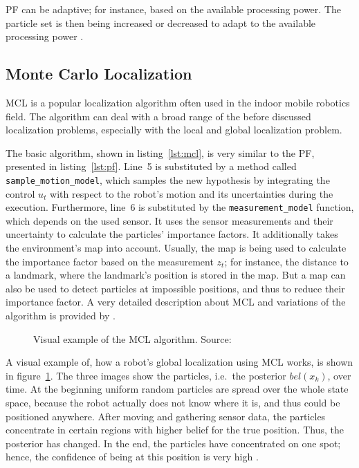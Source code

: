 \ac{PF} can be adaptive; for instance, based on the available processing power. The particle set is then being increased or decreased to adapt to the available processing power \citep{thrun:prob_robo}.


\subsection{Monte Carlo Localization}\label{sec:fund_mcl}
\ac{MCL} is a popular localization algorithm often used in the indoor mobile robotics field. The algorithm can deal with a broad range of the before discussed localization problems, especially with the local and global localization problem.



The basic algorithm, shown in listing~\ref{lst:mcl}, is very similar to the \ac{PF}, presented in listing~\ref{lst:pf}. Line~5 is substituted by a method called \texttt{sample\_motion\_model}, which samples the new hypothesis by integrating the control $u_t$ with respect to the robot's motion and its uncertainties during the execution. Furthermore, line~6 is substituted by the \texttt{measurement\_model} function, which depends on the used sensor. It uses the sensor measurements and their uncertainty to calculate the particles' importance factors. It additionally takes the environment's map into account. Usually, the map is being used to calculate the importance factor based on the measurement $z_t$; for instance, the distance to a landmark, where the landmark's position is stored in the map. But a map can also be used to detect particles at impossible positions, and thus to reduce their importance factor. A very detailed description about \acl{MCL} and variations of the algorithm is provided by \citet{thrun:prob_robo}.

\begin{figure}[width=0.9\textwidth, height=0.4\textheight]
	
	\caption{Visual example of the \ac{MCL} algorithm. Source:~\citep{thrun:prob_robo}}
	\label{fig:mcl}
\end{figure}

A visual example of, how a robot's global localization using \ac{MCL} works, is shown in figure~\ref{fig:mcl}. The three images show the particles, i.e.\ the posterior $bel(x_k)$, over time. At the beginning uniform random particles are spread over the whole state space, because the robot actually does not know where it is, and thus could be positioned anywhere. After moving and gathering sensor data, the particles concentrate in certain regions with higher belief for the true position. Thus, the posterior has changed. In the end, the particles have concentrated on one spot; hence, the confidence of being at this position is very high \citep{thrun:prob_robo}.



